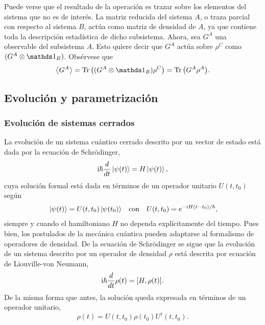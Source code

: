 
Puede verse que el resultado de la operación es trazar sobre los elementos del sistema que no es de interés. La matriz reducida del sistema $A$, o traza parcial con respecto al sistema $B$, actúa como matriz de densidad de $A$, ya que contiene toda la descripción estadística de dicho subsistema. Ahora, sea $G^{A}$ una observable del subsistema $A$. Esto quiere decir que $G^{A}$ actúa sobre $\rho^{C}$ como $(G^{A}\otimes \Id_{B})$. Obsérvese que
\begin{equation}
    \expval{G^{A}}=\Tr\qty((G^A\otimes \Id_B)\rho^C)=\Tr \qty( G^A \rho^A ).\nonumber
\end{equation}

\subsection{Evolución y parametrización}


\subsubsection{Evolución de sistemas cerrados}

La evolución de un sistema cuántico cerrado descrito por un vector de estado está dada por la ecuación de Schrödinger,
\begin{equation}
    \text{i}\hbar\frac{d}{dt}\ket{\psi(t)}=H\ket{\psi(t)},\nonumber
\end{equation}
cuya solución formal está dada en términos de un operador unitario $U(t,t_{0})$ según
\begin{align}
    \ket{\psi(t)}=U(t,t_{0})\ket{\psi(t_{0})} && \text{con} && U(t,t_{0})=e^{-\rmi H(t-t_{0})/\hbar}\rlap{,}\nonumber
\end{align}
siempre y cuando el hamiltoniano $H$ no dependa explícitamente del tiempo. Pues bien, los postulados de la mecánica cuántica pueden adaptarse al formalismo de operadores de densidad. De la ecuación de Schrödinger se sigue que la evolución de un sistema descrito por un operador de densidad $\rho$ está descrita por ecuación de Liouville-von Neumann,
\begin{equation}
    \text{i}\hbar\frac{d}{d t} \rho(t)=[H,\rho(t)].\nonumber
\end{equation}
De la misma forma que antes, la solución queda expresada en términos de un operador unitario,
\begin{equation}
    \rho(t)=U(t,t_{0})\rho(t_{0})U^{\dagger}(t,t_{0}).\nonumber
\end{equation}

